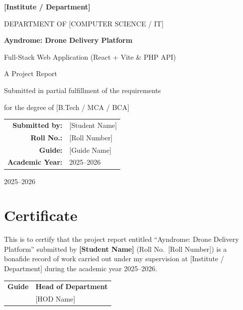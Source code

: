 \documentclass[12pt,a4paper,oneside]{report}
\newcommand{\projecttitle}{Ayndrome: Drone Delivery Platform}
\newcommand{\subtitle}{Full-Stack Web Application (React + Vite \& PHP API)}
\newcommand{\studentname}{[Student Name]}
\newcommand{\rollno}{[Roll Number]}
\newcommand{\guide}{[Guide Name]}
\newcommand{\institute}{[Institute / Department]}
\newcommand{\academicyear}{2025--2026}
\begin{document}
\begin{titlepage}
    \centering
    \vspace*{1.5cm}
    {\Large \textbf{\institute}\par}
    \vspace{0.8cm}
    {\large DEPARTMENT OF [COMPUTER SCIENCE / IT]\par}
    \vspace{2cm}
    {\huge \textbf{\projecttitle}\par}
    \vspace{0.5cm}
    {\Large \subtitle\par}
    \vspace{2cm}
    {\large A Project Report\par}
    \vspace{0.3cm}
    {\large Submitted in partial fulfillment of the requirements\par}
    {\large for the degree of [B.Tech / MCA / BCA]\par}
    \vspace{2cm}
    \begin{tabular}{rl}
        \textbf{Submitted by:} & \studentname \\
        \textbf{Roll No.:}     & \rollno \\
        \textbf{Guide:}        & \guide \\
        \textbf{Academic Year:}& \academicyear \\
    \end{tabular}
    \vfill
    {\large \academicyear\par}
\end{titlepage}


\chapter*{Certificate}
This is to certify that the project report entitled ``\projecttitle'' submitted by
\textbf{\studentname} (Roll No.~\rollno) is a bonafide record of work carried out under my
supervision at \institute{} during the academic year \academicyear.

\vspace{2cm}
\noindent
\begin{tabular}{@{}p{}@{\hfill}p{}@{}}
    \textbf{Guide} & \textbf{Head of Department} \\
    \guide & [HOD Name] \\
\end{tabular}
\end{document}
